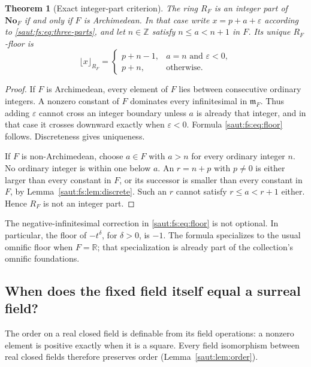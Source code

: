 \documentclass[11pt]{article}
\newtheorem{theorem}{Theorem}[section]
\theoremstyle{definition}
\theoremstyle{remark}
\newcommand{\No}{\mathbf{No}}
\newcommand{\R}{\mathbb R}
\newcommand{\Z}{\mathbb Z}
\newcommand{\mm}{\mathfrak m}
\numberwithin{equation}{section}
\begin{document}
\begin{theorem}[Exact integer-part criterion]\label{saut:fs:thm:ip}
The ring $R_F$ is an integer part of $\No_F$ if and only if $F$ is Archimedean. In
that case write $x=p+a+\varepsilon$ according to \eqref{saut:fs:eq:three-parts}, and
let $n\in\Z$ satisfy $n\le a<n+1$ in $F$. Its unique $R_F$-floor is
\begin{equation}\label{saut:fs:eq:floor}
 \lfloor x\rfloor_{R_F}=
 \begin{cases}
 p+n-1,&a=n\text{ and }\varepsilon<0,\\
 p+n,&\text{otherwise}.
 \end{cases}
\end{equation}
\end{theorem}
\begin{proof}
If $F$ is Archimedean, every element of $F$ lies between consecutive ordinary
integers. A nonzero constant of $F$ dominates every infinitesimal in $\mm_F$. Thus
adding $\varepsilon$ cannot cross an integer boundary unless $a$ is already that
integer, and in that case it crosses downward exactly when $\varepsilon<0$. Formula
\eqref{saut:fs:eq:floor} follows. Discreteness gives uniqueness.

If $F$ is non-Archimedean, choose $a\in F$ with $a>n$ for every ordinary integer $n$.
No ordinary integer is within one below $a$. An $r=n+p$ with $p\ne0$ is either larger
than every constant in $F$, or its successor is smaller than every constant in $F$, by
Lemma~\ref{saut:fs:lem:discrete}. Such an $r$ cannot satisfy $r\le a<r+1$ either.
Hence $R_F$ is not an integer part.
\end{proof}

The negative-infinitesimal correction in \eqref{saut:fs:eq:floor} is not optional. In
particular, the floor of $-t^\delta$, for $\delta>0$, is $-1$. The formula
specializes to the usual omnific floor when $F=\R$; that specialization is already
part of the collection's omnific foundations.

\subsection{When does the fixed field itself equal a surreal field?}

The order on a real closed field is definable from its field operations: a nonzero
element is positive exactly when it is a square. Every field isomorphism between real
closed fields therefore preserves order (Lemma~\ref{saut:lem:order}).
\end{document}
